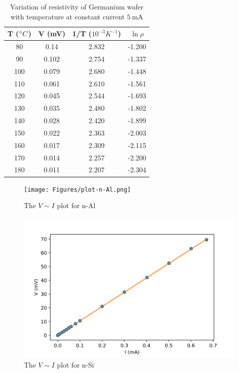 \documentclass[%
 aip,
 amsmath,amssymb,
 reprint,%
]{revtex4-1}
\begin{document}
\begin{table}[]
\caption{Variation of resistivity of Germanium wafer with temperature at constant current $\SI{5}{\milli \ampere}$}
\label{tab:temptable}
\begin{tabular}{@{}cccc@{}}
\toprule
\textbf{T ($\degree C$)} & \textbf{V (mV)} & \textbf{1/T ($10^{-3} K^{-1}$)} & \textbf{$\ln \rho$} \\ \midrule
80             & 0.14              & 2.832             & -1.200                \\
90             & 0.102             & 2.754             & -1.337                \\
100            & 0.079             & 2.680             & -1.448                \\
110            & 0.061             & 2.610             & -1.561                \\
120            & 0.045             & 2.544             & -1.693                \\
130            & 0.035             & 2.480             & -1.802                \\
140            & 0.028             & 2.420             & -1.899                \\
150            & 0.022             & 2.363             & -2.003                \\
160            & 0.017             & 2.309             & -2.115                \\
170            & 0.014             & 2.257             & -2.200                \\
180            & 0.011             & 2.207             & -2.304                \\ \bottomrule
\end{tabular}
\end{table}
\begin{figure}
    \centering
    \texttt{[image: Figures/plot-n-Al.png]}
    \caption{The $V \sim I$ plot for n-Al}
    \label{fig:alplot}
\end{figure}
\begin{figure}
    \centering
    \includegraphics[scale = 0.56]{Figures/plot-n-Si.png}
    \caption{The $V \sim I$ plot for n-Si}
    \label{fig:siplot}
\end{figure}
\end{document}

